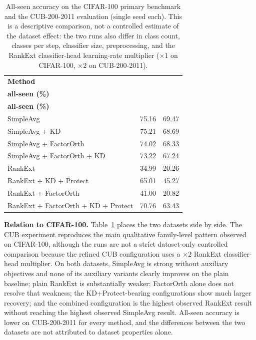 \begin{table}[htbp]
\centering
\begin{tabularx}{\textwidth}{@{}X r r@{}}
\toprule
\textbf{Method} & \shortstack[r]{\textbf{CIFAR-100 $5\times20$}\\\textbf{all-seen (\%)}} & \shortstack[r]{\textbf{CUB-200-2011 $5\times40$}\\\textbf{all-seen (\%)}} \\
\midrule
SimpleAvg & 75.16 & 69.47 \\
SimpleAvg + KD & 75.21 & 68.69 \\
SimpleAvg + FactorOrth & 74.02 & 68.33 \\
SimpleAvg + FactorOrth + KD & 73.22 & 67.24 \\
RankExt & 34.99 & 20.26 \\
RankExt + KD + Protect & 65.01 & 45.27 \\
RankExt + FactorOrth & 41.00 & 20.82 \\
RankExt + FactorOrth + KD + Protect & 70.76 & 63.43 \\
\bottomrule
\end{tabularx}
\caption[CIFAR-100 versus CUB-200-2011 all-seen accuracy]{All-seen accuracy
on the CIFAR-100 primary benchmark and the CUB-200-2011 evaluation (single
seed each). This is a descriptive comparison, not a controlled estimate of
the dataset effect: the two runs also differ in class count, classes per
step, classifier size, preprocessing, and the RankExt classifier-head
learning-rate multiplier ($\times1$ on CIFAR-100, $\times2$ on
CUB-200-2011).}
\label{tab:ch5-cub-vs-cifar}
\end{table}

\textbf{Relation to CIFAR-100.} Table~\ref{tab:ch5-cub-vs-cifar} places the
two datasets side by side. The CUB experiment reproduces the main
qualitative family-level pattern observed on CIFAR-100, although the runs
are not a strict dataset-only controlled comparison because the refined CUB
configuration uses a $\times2$ RankExt classifier-head multiplier. On both
datasets, SimpleAvg is strong without auxiliary objectives and none of its
auxiliary variants clearly improves on the plain baseline; plain RankExt is
substantially weaker; FactorOrth alone does not resolve that weakness; the
KD+Protect-bearing configurations show much larger recovery; and the
combined configuration is the highest observed RankExt result without
reaching the highest observed SimpleAvg result. All-seen accuracy is
lower on CUB-200-2011 for every method, and the differences between the two
datasets are not attributed to dataset properties alone.

